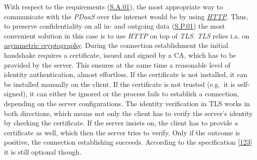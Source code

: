 \documentclass[12pt,english,a4paper,titlepage,cleardoublepage=empty,dottedtoc]{report}
\begin{document}
With respect to the requirements (\protect\hyperlink{sa01}{S.A.01}), the
most appropriate way to communicate with the \emph{PDaaS} over the
internet would be by using \emph{\protect\hyperlink{def--http}{HTTP}}.
Thus, to preserve confidentiality on all in- and outgoing data
(\protect\hyperlink{sp01}{S.P.01}) the most convenient solution in this
case is to use \emph{HTTP} on top of \emph{TLS}. \emph{TLS} relies i.a.
on \protect\hyperlink{def--asym-crypto}{asymmetric cryptography}. During
the connection establishment the initial handshake requires a
certificate, issued and signed by a CA, which has to be provided by the
server. This ensures at the same time a reasonable level of identity
authentication, almost effortless. If the certificate is not installed,
it can be installed manually on the client. If the certificate is not
trusted (e.g.~it is self-signed), it can either be ignored or the
process fails to establish a connection, depending on the server
configurations. The identity verification in TLS works in both
directions, which means not only the client has to verify the server's
identity by checking the certificate. If the server insists on, the
client has to provide a certificate as well, which then the server tries
to verify. Only if the outcome is positive, the connection establishing
succeeds. According to the specification
{[}\protect\hyperlink{ref-web_spec_tls-12_client-auth}{123}{]} it is
still optional though.
\end{document}
